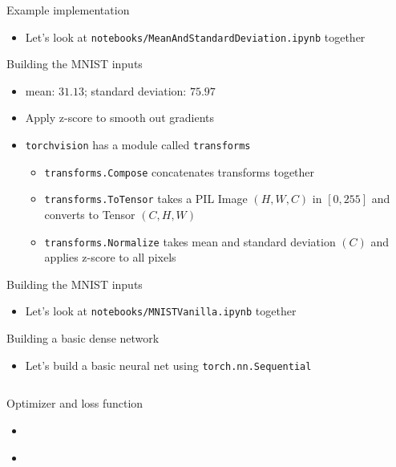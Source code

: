 \documentclass[hyperref={pdfpagelabels=false},12pt]{beamer}
\newcommand{\code}[2]{\texttt{#2}}
\newcommand{\python}[1]{\code{python}{#1}}
\newcommand{\namedUrl}[2]{\href{#1}{\color{blue}{#2}}}
\newcommand{\pygment}[3]{\inputminted[bgcolor=lightgray,linenos,fontsize=#1]{#2}{#3}}
\begin{document}
\begin{frame}{Example implementation}
  \begin{itemize}
    \item Let's look at \texttt{notebooks/MeanAndStandardDeviation.ipynb} together
  \end{itemize}
\end{frame}

\begin{frame}{Building the MNIST inputs}
  \begin{itemize}
    \item mean: $31.13$; standard deviation: $75.97$
    \item Apply z-score to smooth out gradients
    \item \texttt{torchvision} has a module called \texttt{transforms}
    \begin{itemize}
      \item \python{transforms.Compose} concatenates transforms together
      \item \python{transforms.ToTensor} takes a PIL Image $(H, W, C)$
        in $[0, 255]$ and converts to Tensor $(C, H, W)$
      \item \python{transforms.Normalize} takes mean and standard deviation
        $(C)$ and applies z-score to all pixels
    \end{itemize}
  \end{itemize}
\end{frame}

\begin{frame}{Building the MNIST inputs}
  \begin{itemize}
    \item Let's look at \texttt{notebooks/MNISTVanilla.ipynb} together
  \end{itemize}
\end{frame}

\begin{frame}{Building a basic dense network}
  \begin{itemize}
    \item Let's build a basic neural net using \python{torch.nn.Sequential}
  \end{itemize}
  \pygment{\scriptsize}{python}{code/basic-dense-model.py}
\end{frame}

\begin{frame}{Optimizer and loss function}
  \begin{itemize}
    \item \namedUrl{https://arxiv.org/abs/1412.6980}{Adam Optimizer}
    \item \namedUrl{https://pytorch.org/docs/stable/nn.html\#crossentropyloss}{Cross Entropy Loss}
  \end{itemize}
  \pygment{\scriptsize}{python}{code/optimizer-loss-fn.py}
\end{frame}
\end{document}
